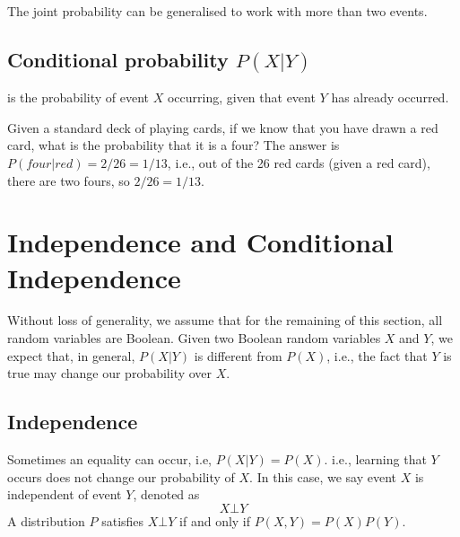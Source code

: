 The joint probability can be generalised to work with more than two events. 


\subsection*{Conditional probability $P(X|Y)$}
 is the probability of event $X$ occurring, given that event $Y$ has already occurred.

\begin{example}
Given a standard deck of playing cards, if we know that you have drawn a red card, what is the probability that it is a four? The answer is  $P(four|red)=2/26=1/13$, i.e., out of the 26 red cards (given a red card), there are two fours, so $2/26=1/13$.
\end{example}

\section{Independence and Conditional Independence}\label{sec:indepandcondindep}

Without loss of generality, we assume that for the remaining of this section, all random variables are Boolean. 
Given two Boolean random variables $X$ and $Y$, we expect that, in general, $P(X|Y)$ is different from $P(X)$, i.e., the fact that $Y$ is true may  change our probability over $X$.  

\subsection*{Independence}

Sometimes an equality can occur, i.e, $P(X|Y)=P(X)$.  
 i.e., learning that $Y$ occurs does not change our probability of $X$. In this case, we say event $X$ is independent of event $Y$, denoted as %
 \begin{equation}
     X \bot Y
 \end{equation}
%
A distribution $P$ satisfies $X \bot Y$ if and only if $P(X,Y)=P(X)P(Y)$. %


